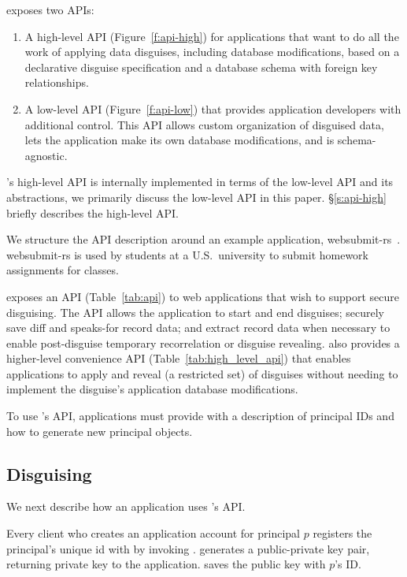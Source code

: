\sys exposes two APIs:
\begin{enumerate}[nosep]
 \item A high-level API (Figure~\ref{f:api-high}) for applications that want \sys to do
   all the work of applying data disguises, including database modifications, based on
   a declarative disguise specification and a database schema with foreign key
   relationships.
 \item A low-level API (Figure~\ref{f:api-low}) that provides application developers with
   additional control. This API allows custom organization of disguised data, lets the
   application make its own database modifications, and is schema-agnostic.
\end{enumerate}
%
\sys's high-level API is internally implemented in terms of the low-level API and its
abstractions, we primarily discuss the low-level API in this paper.
%
\S\ref{s:api-high} briefly describes the high-level API.
%


%
We structure the API description around an example application, websubmit-rs~\cite{websubmit-rs}.
%
websubmit-rs is used by students at a U.S.\ university to submit homework assignments for classes.
%


\sys exposes an API (Table~\ref{tab:api}) to web applications that wish to support secure
disguising.
%
The API allows the application to start and end disguises; securely save diff and speaks-for record
data; and extract record data when necessary to enable post-disguise temporary recorrelation or
disguise revealing.
%
\sys also provides a higher-level convenience API (Table~\ref{tab:high_level_api}) that enables
applications to apply and reveal (a restricted set) of disguises without needing to implement the
disguise's application database modifications.

To use \sys's API, applications must provide \sys with a description of principal IDs and how to
generate new principal objects.

\subsection{Disguising}

We next describe how an application uses \sys's API.

Every client who creates an application account for principal $p$ registers the principal's unique id
with \sys by invoking . \sys generates a public-private key pair, returning private key  to the
application. \sys saves the public key  with $p$'s ID.

